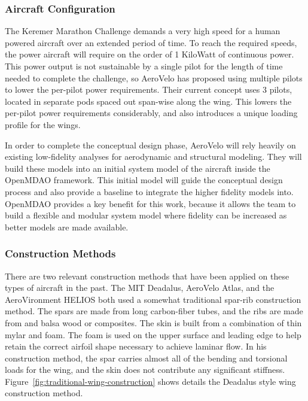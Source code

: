 \documentclass[]{aiaa-tc}
\begin{document}
        \subsubsection{Aircraft Configuration}

        The Keremer Marathon Challenge demands a very high speed for a human powered aircraft over an extended period of time. To reach the 
        required speeds, the power aircraft will require on the order of 1 KiloWatt of continuous power. This power output is not 
        sustainable by a single pilot for the length of time needed to complete the challenge, so AeroVelo has proposed using multiple 
        pilots to lower the per-pilot power requirements. Their current concept uses 3 pilots, located in separate pods spaced out 
        span-wise along the wing. This lowers the per-pilot power requirements considerably, and also introduces a unique loading profile 
        for the wings. 

        In order to complete the conceptual design phase, AeroVelo will rely heavily on existing low-fidelity analyses for aerodynamic and 
        structural modeling. They will build these models into an initial system model of the aircraft inside the OpenMDAO framework. 
        This initial model will guide the conceptual design process and also provide a baseline to integrate the higher fidelity models into. 
        OpenMDAO provides a key benefit for this work, because it allows the team to build a flexible and modular system model where fidelity can 
        be increased as better models are made available. 

        \subsubsection{Construction Methods}

        There are two relevant construction methods that have been applied on these types of aircraft in the past. The MIT Deadalus, 
        AeroVelo Atlas, and the AeroVironment HELIOS both used a somewhat traditional spar-rib construction method. The spars are 
        made from long carbon-fiber tubes, and the ribs are made from and balsa wood or composites. The skin is built from a
        combination of thin mylar and foam. The foam is used on the upper surface and leading edge to help retain the correct airfoil 
        shape necessary to achieve laminar flow. In his construction method, the spar carries almost all of the bending and torsional 
        loads for the wing, and the skin does not contribute any significant stiffness. Figure~\ref{fig:traditional-wing-construction} shows
        details the Deadalus style wing construction method. 
\end{document}
